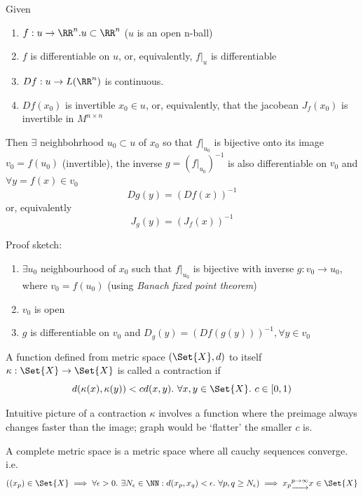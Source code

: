 \begin{thm}
  Given
  \begin{enumerate}
  \item $f: u \to \RR^n. u \subset \RR^n$ ($u$ is an open n-ball)
  \item $f$ is differentiable on $u$, or, equivalently, $f|_u$ is differentiable
  \item $Df: u \to L(\RR^n)$ is continuous.
  \item $Df(x_0)$ is invertible $x_0 \in u$, or, equivalently, that the jacobean $J_f(x_0)$ is invertible in $M^{n\times n}$
  \end{enumerate}
  Then $\exists$ neighbohrhood $u_0 \subset u$ of $x_0$ so that $f|_{u_0}$ is bijective onto its image $v_0 = f(u_0)$ (invertible), the inverse $g = (f|_{u_0})^{-1}$ is also differentiable on $v_0$ and $\forall y = f(x) \in v_0$
  $$Dg(y) = (Df(x))^{-1}$$
  or, equivalently
  $$J_g(y) = (J_f(x))^{-1}$$
\end{thm}

Proof sketch:
\begin{enumerate}[I]
\item $\exists u_0$ neighbourhood of $x_0$ such that $f|_{u_0}$ is bijective with inverse $g: v_0 \rightarrow u_0$, where $v_0 = f(u_0)$ (using \emph{Banach fixed point theorem})
\item $v_0$ is open
\item $g$ is differentiable on $v_0$ and $D_g(y) = (Df(g(y)))^{-1}, \forall y \in v_0$
\end{enumerate}

\begin{defn}
  A function defined from metric space $(\Set{X}, d)$ to itself $\kappa: \Set{X} \rightarrow \Set{X}$ is called a contraction if
  $$d(\kappa(x), \kappa(y)) < cd(x,y).\ \forall x, y \in \Set{X}.\ c \in [0, 1)$$
\end{defn}

\begin{rem}
  Intuitive picture of a contraction $\kappa$ involves  a function where the preimage always changes faster than the image; graph would be `flatter' the smaller $c$ is.
\end{rem}

\begin{ldefn}
  A complete metric space is a metric space where all cauchy sequences converge. i.e. $$((x_p) \in \Set{X} \implies \forall \epsilon > 0 . \ \exists N_\epsilon \in \NN : d(x_p, x_q) < \epsilon .\  \forall p, q \geq N_\epsilon) \implies x_p \underrightarrow{^{p\rightarrow \infty}} x \in \Set{X} $$
\end{ldefn}

